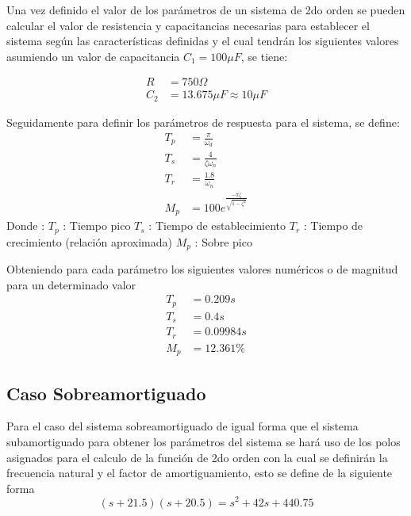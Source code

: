 \documentclass[conference]{IEEEtran}
\begin{document}
	Una vez definido el valor de los parámetros de un sistema de 2do orden se pueden calcular el valor de resistencia y capacitancias necesarias para establecer el sistema según las características definidas y el cual tendrán los siguientes valores asumiendo un valor de capacitancia $C_1 = 100\mu F \label{eq:sub-capacitancia-c1}$, se tiene: 
	
	\begin{align}
		R &=  750\Omega \label{eq:sub-resistencia}\\
		C_2 &= 13.675 \mu F \approx 10 \mu F \label{eq:sub-capacitancia-c2}
	\end{align}
	
	Seguidamente para definir los parámetros de respuesta para el sistema, se define: \\
	
	\begin{align}
		T_p &= \frac{\pi}{\omega_d} \\
		T_s &= \frac{4}{\zeta \omega_n} \\
		T_r &= \frac{1.8}{\omega_n} \\
		M_p &= 100e^{ \frac{-\pi \zeta}{ \sqrt{1 - \zeta^2}} }
	\end{align}
	Donde :
	$T_p$ : Tiempo pico 
	$T_s$ : Tiempo de establecimiento 
	$T_r$ : Tiempo de crecimiento (relación aproximada)
	$M_p$ : Sobre pico
	
	Obteniendo para cada parámetro los siguientes valores numéricos o de magnitud para un determinado valor
	\begin{align}
		T_p &= 0.209s \\
		T_s &= 0.4s \\
		T_r &= 0.09984s \\
		M_p &= 12.361\%
	\end{align}
	
	
	\subsection{Caso Sobreamortiguado}
	Para el caso del sistema sobreamortiguado de igual forma que el sistema subamortiguado para obtener los parámetros del sistema se hará uso de los polos asignados para el calculo de la función de 2do orden con la cual se definirán la frecuencia natural y el factor de amortiguamiento, esto se define de la siguiente forma
	\begin{equation}
		(s + 21.5)(s + 20.5) = s^2 + 42s + 440.75
		\label{eq:sobreamortiguado}
	\end{equation}
	
\end{document}
